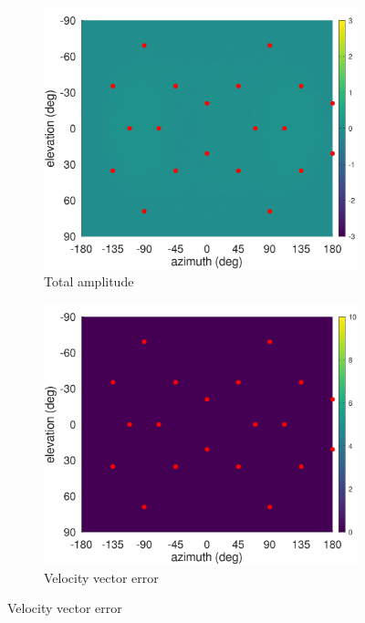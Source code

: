 \documentclass[12pt]{report}
\begin{document}
\begin{figure}[tbp]
  \centering

  \begin{subfigure}{0.3\textwidth}
    \includegraphics[width=\linewidth]{figures/A_dodeca.png}
    \caption{\centering Total amplitude}
  \end{subfigure}
  \hfill
  \begin{subfigure}{0.3\textwidth}
    \includegraphics[width=\linewidth]{figures/errAzV_dodeca.png}
    \caption{\centering Velocity vector error}
  \end{subfigure}

\end{figure}
\end{document}
